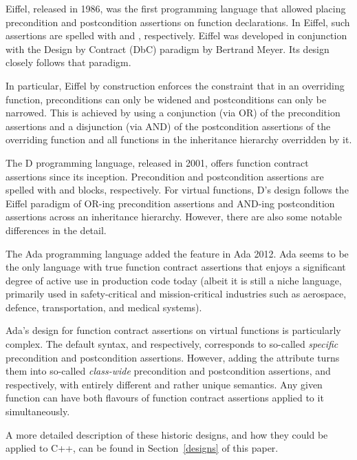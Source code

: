 Eiffel, released in 1986, was the first programming language that allowed placing precondition and postcondition assertions on function declarations. In Eiffel, such assertions are spelled with  and , respectively. Eiffel was developed in conjunction with the Design by Contract (DbC) paradigm by Bertrand Meyer. Its design closely follows that paradigm.

In particular, Eiffel by construction enforces the constraint that in an overriding function, preconditions can only be widened and postconditions can only be narrowed. This is achieved by using a conjunction (via OR) of the precondition assertions and a disjunction (via AND) of the postcondition assertions of the overriding function and all functions in the inheritance hierarchy overridden by it.

The D programming language, released in 2001, offers function contract assertions since its inception. Precondition and postcondition assertions are spelled with  and  blocks, respectively. For virtual functions, D's design follows the Eiffel paradigm of OR-ing precondition assertions and AND-ing postcondition assertions across an inheritance hierarchy. However, there are also some notable differences in the detail.

The Ada programming language added the feature in Ada 2012. Ada seems to be the only language with true function contract assertions that enjoys a significant degree of active use in production code today (albeit it is still a niche language, primarily used in safety-critical and mission-critical industries such as aerospace, defence, transportation, and medical systems).

Ada's design for function contract assertions on virtual functions is particularly complex. The default syntax,  and  respectively, corresponds to so-called \emph{specific} precondition and postcondition assertions. However, adding the  attribute turns them into so-called  \emph{class-wide} precondition and postcondition assertions,  and  respectively, with entirely different and rather unique semantics. Any given function can have both flavours of function contract assertions applied to it simultaneously.

A more detailed description of these historic designs, and how they could be applied to C++, can be found in Section~\ref{designs} of this paper.

